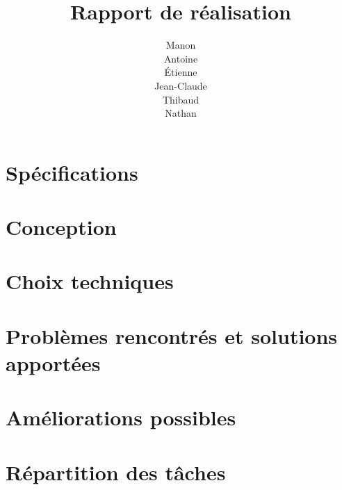 \documentclass[12pt,titlepage,a4paper]{report}
\title{Rapport de réalisation}
\author{Manon \bsc{Ansart}\\ Antoine \bsc{Augusti}\\ Étienne \bsc{Batise}\\ Jean-Claude \bsc{Bernard}\\ Thibaud \bsc{Dauce}\\ Nathan \bsc{Malo}}
\begin{document}

	\tableofcontents

	\chapter{Spécifications}
		

	\chapter{Conception}
		

	\chapter{Choix techniques}
		
	\chapter{Problèmes rencontrés et solutions apportées}
		
	\label{pb}
	\chapter{Améliorations possibles}
		

	\chapter{Répartition des tâches}
		
\end{document}

